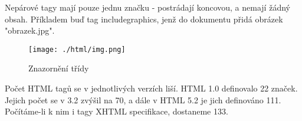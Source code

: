 \documentclass[main.tex]{subfiles}
\begin{document}
Nepárové tagy mají pouze jednu značku - postrádají koncovou, a nemají žádný obsah. Příkladem buď tag includegraphics, jenž do dokumentu přidá obrázek "obrazek.jpg".
		\begin{figure}[h]
			\centering
			\texttt{[image: ./html/img.png]}
			\caption{Znazornění třídy}
		\end{figure}

Počet HTML tagů se v jednotlivých verzích liší. HTML 1.0 definovalo 22 značek. Jejich počet se v 3.2 zvýšil na 70, a dále v HTML 5.2 je jich definováno 111. Počítáme-li k nim i tagy XHTML specifikace, dostaneme 133. \cite{web:en:counting_html}
\end{document}

